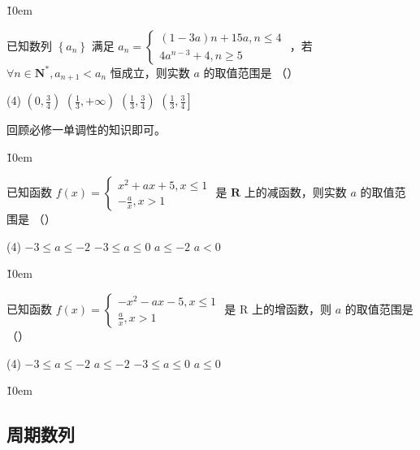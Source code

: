 \v{10em}

\begin{example}
    已知数列 $\left\{a_n\right\}$ 满足 $a_n=\left\{\begin{array}{l}(1-3 a) n+15 a, n \leq 4 \\ 4 a^{n-3}+4, n \geq 5\end{array}\right.$ ，若 $\forall n \in \mathbf{N}^*, a_{n+1}<a_n$ 恒成立，则实数 $a$ 的取值范围是 （\qquad）
    \begin{tasks}(4)
        \task $\left(0, \frac{3}{4}\right)$
        \task $\left(\frac{1}{3},+\infty\right)$
        \task $\left(\frac{1}{3}, \frac{3}{4}\right)$
        \task $\left(\frac{1}{3}, \frac{3}{4}\right]$
    \end{tasks}
\end{example}

\begin{tips}
    回顾必修一单调性的知识即可。
\end{tips}

\v{10em}

\begin{example}
    已知函数 $f(x)=\left\{\begin{array}{c}x^2+a x+5, x \leq 1 \\ -\frac{a}{x}, x>1\end{array}\right.$ 是 $\mathbf{R}$ 上的减函数，则实数 $a$ 的取值范围是 （\qquad）
    \begin{tasks}(4)
        \task $-3 \leq a \leq-2$
        \task $-3 \leq a \leq 0$
        \task $a \leq-2$
        \task $a<0$
    \end{tasks}
\end{example}

\v{10em}

\begin{example}
    已知函数 $f(x)=\left\{\begin{array}{l}-x^2-a x-5, x \leq 1 \\ \frac{a}{x}, x>1\end{array}\right.$ 是 R 上的增函数，则 $a$ 的取值范围是 （\qquad）
    \begin{tasks}(4)
        \task $-3 \leq a \leq-2$
        \task $a \leq-2$
        \task $-3 \leq a \leq 0$
        \task $a \leq 0$
    \end{tasks}
\end{example}

\v{10em}

\subsection{周期数列}

